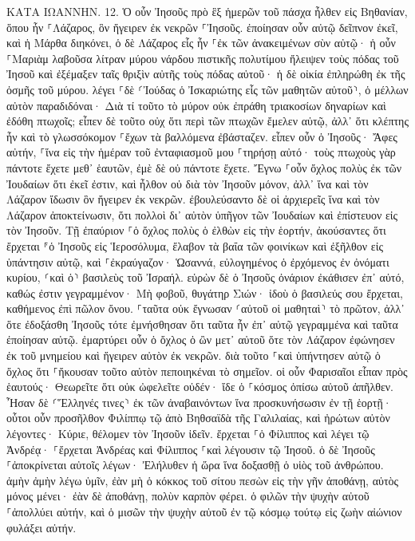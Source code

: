 \documentclass[twoside, 9pt]{extreport}
\begin{document}
ΚΑΤΑ ΙΩΑΝΝΗΝ.
12.
Ὁ οὖν Ἰησοῦς πρὸ ἓξ ἡμερῶν τοῦ πάσχα ἦλθεν εἰς Βηθανίαν, ὅπου ἦν ⸀Λάζαρος, ὃν ἤγειρεν ἐκ νεκρῶν ⸀Ἰησοῦς. 
ἐποίησαν οὖν αὐτῷ δεῖπνον ἐκεῖ, καὶ ἡ Μάρθα διηκόνει, ὁ δὲ Λάζαρος εἷς ἦν ⸀ἐκ τῶν ἀνακειμένων σὺν αὐτῷ· 
ἡ οὖν ⸀Μαριὰμ λαβοῦσα λίτραν μύρου νάρδου πιστικῆς πολυτίμου ἤλειψεν τοὺς πόδας τοῦ Ἰησοῦ καὶ ἐξέμαξεν ταῖς θριξὶν αὐτῆς τοὺς πόδας αὐτοῦ· ἡ δὲ οἰκία ἐπληρώθη ἐκ τῆς ὀσμῆς τοῦ μύρου. 
λέγει ⸀δὲ ⸂Ἰούδας ὁ Ἰσκαριώτης εἷς τῶν μαθητῶν αὐτοῦ⸃, ὁ μέλλων αὐτὸν παραδιδόναι· 
Διὰ τί τοῦτο τὸ μύρον οὐκ ἐπράθη τριακοσίων δηναρίων καὶ ἐδόθη πτωχοῖς; 
εἶπεν δὲ τοῦτο οὐχ ὅτι περὶ τῶν πτωχῶν ἔμελεν αὐτῷ, ἀλλ᾽ ὅτι κλέπτης ἦν καὶ τὸ γλωσσόκομον ⸀ἔχων τὰ βαλλόμενα ἐβάσταζεν. 
εἶπεν οὖν ὁ Ἰησοῦς· Ἄφες αὐτήν, ⸀ἵνα εἰς τὴν ἡμέραν τοῦ ἐνταφιασμοῦ μου ⸀τηρήσῃ αὐτό· 
τοὺς πτωχοὺς γὰρ πάντοτε ἔχετε μεθ᾽ ἑαυτῶν, ἐμὲ δὲ οὐ πάντοτε ἔχετε. 
Ἔγνω ⸀οὖν ὄχλος πολὺς ἐκ τῶν Ἰουδαίων ὅτι ἐκεῖ ἐστιν, καὶ ἦλθον οὐ διὰ τὸν Ἰησοῦν μόνον, ἀλλ᾽ ἵνα καὶ τὸν Λάζαρον ἴδωσιν ὃν ἤγειρεν ἐκ νεκρῶν. 
ἐβουλεύσαντο δὲ οἱ ἀρχιερεῖς ἵνα καὶ τὸν Λάζαρον ἀποκτείνωσιν, 
ὅτι πολλοὶ δι᾽ αὐτὸν ὑπῆγον τῶν Ἰουδαίων καὶ ἐπίστευον εἰς τὸν Ἰησοῦν. 
Τῇ ἐπαύριον ⸀ὁ ὄχλος πολὺς ὁ ἐλθὼν εἰς τὴν ἑορτήν, ἀκούσαντες ὅτι ἔρχεται ⸁ὁ Ἰησοῦς εἰς Ἱεροσόλυμα, 
ἔλαβον τὰ βαΐα τῶν φοινίκων καὶ ἐξῆλθον εἰς ὑπάντησιν αὐτῷ, καὶ ⸀ἐκραύγαζον· Ὡσαννά, εὐλογημένος ὁ ἐρχόμενος ἐν ὀνόματι κυρίου, ⸂καὶ ὁ⸃ βασιλεὺς τοῦ Ἰσραήλ. 
εὑρὼν δὲ ὁ Ἰησοῦς ὀνάριον ἐκάθισεν ἐπ᾽ αὐτό, καθώς ἐστιν γεγραμμένον· 
Μὴ φοβοῦ, θυγάτηρ Σιών· ἰδοὺ ὁ βασιλεύς σου ἔρχεται, καθήμενος ἐπὶ πῶλον ὄνου. 
⸀ταῦτα οὐκ ἔγνωσαν ⸂αὐτοῦ οἱ μαθηταὶ⸃ τὸ πρῶτον, ἀλλ᾽ ὅτε ἐδοξάσθη Ἰησοῦς τότε ἐμνήσθησαν ὅτι ταῦτα ἦν ἐπ᾽ αὐτῷ γεγραμμένα καὶ ταῦτα ἐποίησαν αὐτῷ. 
ἐμαρτύρει οὖν ὁ ὄχλος ὁ ὢν μετ᾽ αὐτοῦ ὅτε τὸν Λάζαρον ἐφώνησεν ἐκ τοῦ μνημείου καὶ ἤγειρεν αὐτὸν ἐκ νεκρῶν. 
διὰ τοῦτο ⸀καὶ ὑπήντησεν αὐτῷ ὁ ὄχλος ὅτι ⸀ἤκουσαν τοῦτο αὐτὸν πεποιηκέναι τὸ σημεῖον. 
οἱ οὖν Φαρισαῖοι εἶπαν πρὸς ἑαυτούς· Θεωρεῖτε ὅτι οὐκ ὠφελεῖτε οὐδέν· ἴδε ὁ ⸀κόσμος ὀπίσω αὐτοῦ ἀπῆλθεν. 
Ἦσαν δὲ ⸂Ἕλληνές τινες⸃ ἐκ τῶν ἀναβαινόντων ἵνα προσκυνήσωσιν ἐν τῇ ἑορτῇ· 
οὗτοι οὖν προσῆλθον Φιλίππῳ τῷ ἀπὸ Βηθσαϊδὰ τῆς Γαλιλαίας, καὶ ἠρώτων αὐτὸν λέγοντες· Κύριε, θέλομεν τὸν Ἰησοῦν ἰδεῖν. 
ἔρχεται ⸀ὁ Φίλιππος καὶ λέγει τῷ Ἀνδρέᾳ· ⸀ἔρχεται Ἀνδρέας καὶ Φίλιππος ⸀καὶ λέγουσιν τῷ Ἰησοῦ. 
ὁ δὲ Ἰησοῦς ⸀ἀποκρίνεται αὐτοῖς λέγων· Ἐλήλυθεν ἡ ὥρα ἵνα δοξασθῇ ὁ υἱὸς τοῦ ἀνθρώπου. 
ἀμὴν ἀμὴν λέγω ὑμῖν, ἐὰν μὴ ὁ κόκκος τοῦ σίτου πεσὼν εἰς τὴν γῆν ἀποθάνῃ, αὐτὸς μόνος μένει· ἐὰν δὲ ἀποθάνῃ, πολὺν καρπὸν φέρει. 
ὁ φιλῶν τὴν ψυχὴν αὐτοῦ ⸀ἀπολλύει αὐτήν, καὶ ὁ μισῶν τὴν ψυχὴν αὐτοῦ ἐν τῷ κόσμῳ τούτῳ εἰς ζωὴν αἰώνιον φυλάξει αὐτήν. 
\end{document}
